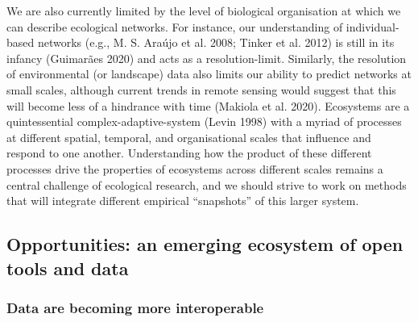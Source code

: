 \documentclass[10pt,oneside]{article}
\begin{document}
We are also currently limited by the level of biological organisation at
which we can describe ecological networks. For instance, our
understanding of individual-based networks (e.g., M. S. Araújo et al.
2008; Tinker et al. 2012) is still in its infancy (Guimarães 2020) and
acts as a resolution-limit. Similarly, the resolution of environmental
(or landscape) data also limits our ability to predict networks at small
scales, although current trends in remote sensing would suggest that
this will become less of a hindrance with time (Makiola et al. 2020).
Ecosystems are a quintessential complex-adaptive-system (Levin 1998)
with a myriad of processes at different spatial, temporal, and
organisational scales that influence and respond to one another.
Understanding how the product of these different processes drive the
properties of ecosystems across different scales remains a central
challenge of ecological research, and we should strive to work on
methods that will integrate different empirical ``snapshots'' of this
larger system.

\hypertarget{opportunities-an-emerging-ecosystem-of-open-tools-and-data}{%
\subsection{Opportunities: an emerging ecosystem of open tools and
data}\label{opportunities-an-emerging-ecosystem-of-open-tools-and-data}}

\hypertarget{data-are-becoming-more-interoperable}{%
\subsubsection{Data are becoming more
interoperable}\label{data-are-becoming-more-interoperable}}
\end{document}
